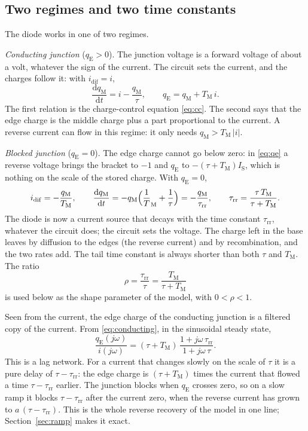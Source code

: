 \documentclass[10pt,a4paper]{scrartcl}
\newcommand{\taurr}{\tau_\mathrm{rr}}
\newcommand{\TM}{T_\mathrm{M}}
\newcommand{\qE}{q_\mathrm{E}}
\newcommand{\qM}{q_\mathrm{M}}
\newcommand{\idif}{i_\mathrm{dif}}
\newcommand{\IS}{I_\mathrm{S}}
\newcommand{\diff}{\mathrm{d}}
\begin{document}
\subsection{Two regimes and two time constants}
\label{sec:regimes}
The diode works in one of two regimes.

\emph{Conducting junction} ($\qE > 0$). The junction voltage is a forward voltage of about a volt, whatever the sign of the current. The circuit sets the current, and the charges follow it: with $\idif = i$,
\begin{equation}
\frac{\diff \qM}{\diff t} = i - \frac{\qM}{\tau} , \qquad \qE = \qM + \TM\, i .
\label{eq:conducting}
\end{equation}
The first relation is the charge-control equation \eqref{eq:cc}. The second says that the edge charge is the middle charge plus a part proportional to the current. A reverse current can flow in this regime: it only needs $\qM > \TM\,|i|$.

\emph{Blocked junction} ($\qE = 0$). The edge charge cannot go below zero: in \eqref{eq:qe} a reverse voltage brings the bracket to $-1$ and $\qE$ to $-(\tau+\TM)\IS$, which is nothing on the scale of the stored charge. With $\qE = 0$,
\begin{equation}
\idif = -\frac{\qM}{\TM} , \qquad \frac{\diff\qM}{\diff t} = -\qM\Bigl(\frac1\TM + \frac1\tau\Bigr) = -\frac{\qM}{\taurr} , \qquad \taurr = \frac{\tau\,\TM}{\tau+\TM} .
\label{eq:blocked}
\end{equation}
The diode is now a current source that decays with the time constant $\taurr$, whatever the circuit does; the circuit sets the voltage. The charge left in the base leaves by diffusion to the edges (the reverse current) and by recombination, and the two rates add. The tail time constant is always shorter than both $\tau$ and $\TM$. The ratio
\begin{equation}
\rho = \frac{\taurr}{\tau} = \frac{\TM}{\tau+\TM}
\label{eq:rho}
\end{equation}
is used below as the shape parameter of the model, with $0 < \rho < 1$.

Seen from the current, the edge charge of the conducting junction is a filtered copy of the current. From \eqref{eq:conducting}, in the sinusoidal steady state,
\begin{equation}
\frac{\qE(j\omega)}{i(j\omega)} = (\tau+\TM)\,\frac{1+j\omega\,\taurr}{1+j\omega\,\tau} .
\label{eq:filter}
\end{equation}
This is a lag network. For a current that changes slowly on the scale of $\tau$ it is a pure delay of $\tau-\taurr$: the edge charge is $(\tau+\TM)$ times the current that flowed a time $\tau-\taurr$ earlier. The junction blocks when $\qE$ crosses zero, so on a slow ramp it blocks $\tau-\taurr$ after the current zero, when the reverse current has grown to $a\,(\tau-\taurr)$. This is the whole reverse recovery of the model in one line; Section~\ref{sec:ramp} makes it exact.
\end{document}
